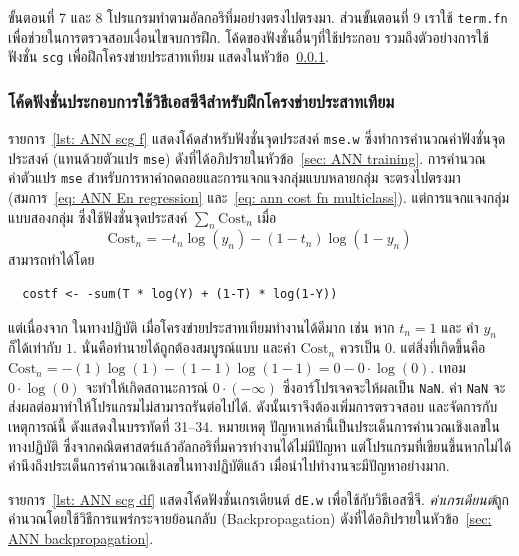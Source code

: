 ขั้นตอนที่ 7 และ 8 โปรแกรมทำตามอัลกอริทึ่มอย่างตรงไปตรงมา.
ส่วนขั้นตอนที่ 9 เราใช้ \texttt{term.fn} เพื่อช่วยในการตรวจสอบเงื่อนไขจบการฝึก.
โค้ดของฟังชั่นอื่นๆที่ใช้ประกอบ รวมถึงตัวอย่างการใช้ฟังชั่น \texttt{scg} เพื่อฝึกโครงข่ายประสาทเทียม แสดงในหัวข้อ~\ref{sec: ann tips scg other codes}.

\subsubsection{โค้ดฟังชั่นประกอบการใช้วิธีเอสซีจีสำหรับฝึกโครงข่ายประสาทเทียม}
\label{sec: ann tips scg other codes}

รายการ~\ref{lst: ANN scg f} แสดงโค้ดสำหรับฟังชั่นจุดประสงค์ \texttt{mse.w} ซึ่งทำการคำนวณค่าฟังชั่นจุดประสงค์ (แทนด้วยตัวแปร \texttt{mse}) ดังที่ได้อภิปรายในหัวข้อ~\ref{sec: ANN training}.
การคำนวณค่าตัวแปร \texttt{mse} สำหรับการหาค่าถดถอยและการแจกแจงกลุ่มแบบหลายกลุ่ม จะตรงไปตรงมา (สมการ~\ref{eq: ANN En regression} และ~\ref{eq: ann cost fn multiclass}).
แต่การแจกแจงกลุ่มแบบสองกลุ่ม ซึ่งใช้ฟังชั่นจุดประสงค์ $\sum_n \mathrm{Cost}_n$ เมื่อ
\[
\mathrm{Cost}_n = - t_n \log (y_n) - (1-t_n) \log(1-y_n)
\] 
สามารถทำได้โดย
\begin{verbatim}
  costf <- -sum(T * log(Y) + (1-T) * log(1-Y))
\end{verbatim}
แต่เนื่องจาก ในทางปฏิบัติ เมื่อโครงข่ายประสาทเทียมทำงานได้ดีมาก เช่น 
หาก $t_n = 1$ และ ค่า $y_n$ ก็ได้เท่ากับ $1$.
นั่นคือทำนายได้ถูกต้องสมบูรณ์แบบ และค่า $\mathrm{Cost}_n$ ควรเป็น $0$.
แต่สิ่งที่เกิดขึ้นคือ $\mathrm{Cost}_n = - (1) \log (1) - (1-1) \log(1-1) = 0 - 0 \cdot \log(0)$.
เทอม $0 \cdot \log(0)$ จะทำให้เกิดสถานะการณ์ $0 \cdot (-\infty)$ ซึ่งอาร์โปรเจคจะให้ผลเป็น \texttt{NaN}.
ค่า \texttt{NaN} จะส่งผลต่อมาทำให้โปรแกรมไม่สามารถรันต่อไปได้.
ดังนั้นเราจึงต้องเพิ่มการตรวจสอบ และจัดการกับเหตุการณ์นี้ ดังแสดงในบรรทัดที่ 31--34.
หมายเหตุ ปัญหาเหล่านี้เป็นประเด็นการคำนวณเชิงเลขในทางปฏิบัติ ซึ่งจากคณิตศาสตร์แล้วอัลกอริทึ่มควรทำงานได้ไม่มีปัญหา
แต่โปรแกรมที่เขียนขึ้นหากไม่ได้คำนึงถึงประเด็นการคำนวณเชิงเลขในทางปฏิบัติแล้ว เมื่อนำไปทำงานจะมีปัญหาอย่างมาก.



รายการ~\ref{lst: ANN scg df} แสดงโค้ดฟังชั่นเกรเดียนต์ \texttt{dE.w} เพื่อใช้กับวิธีเอสซีจี.
\textit{ค่าเกรเดียนต์}ถูกคำนวณโดยใช้วิธีการแพร่กระจายย้อนกลับ (Backpropagation) ดังที่ได้อภิปรายในหัวข้อ~\ref{sec: ANN backpropagation}.

